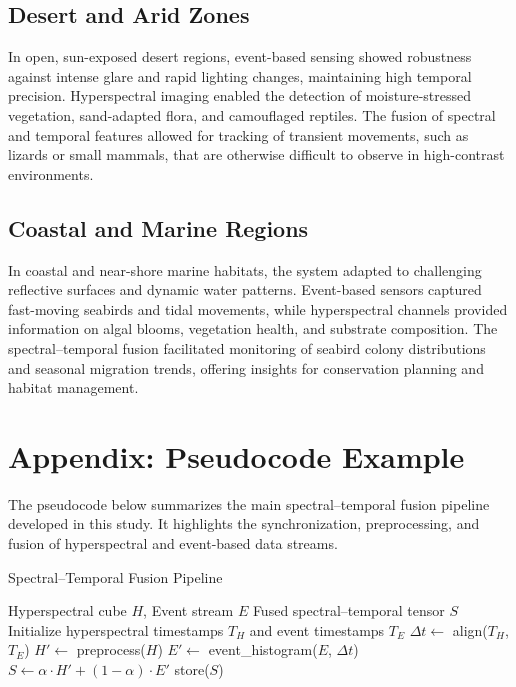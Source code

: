 \documentclass[conference]{IEEEtran}
\begin{document}
\subsection{Desert and Arid Zones}
In open, sun-exposed desert regions, event-based sensing showed robustness against intense glare and rapid lighting changes, maintaining high temporal precision. Hyperspectral imaging enabled the detection of moisture-stressed vegetation, sand-adapted flora, and camouflaged reptiles. The fusion of spectral and temporal features allowed for tracking of transient movements, such as lizards or small mammals, that are otherwise difficult to observe in high-contrast environments.

\subsection{Coastal and Marine Regions}
In coastal and near-shore marine habitats, the system adapted to challenging reflective surfaces and dynamic water patterns. Event-based sensors captured fast-moving seabirds and tidal movements, while hyperspectral channels provided information on algal blooms, vegetation health, and substrate composition. The spectral–temporal fusion facilitated monitoring of seabird colony distributions and seasonal migration trends, offering insights for conservation planning and habitat management.


\section{Appendix: Pseudocode Example}

The pseudocode below summarizes the main spectral–temporal fusion pipeline developed in this study. It highlights the synchronization, preprocessing, and fusion of hyperspectral and event-based data streams.

\begin{algorithm}[H]
\caption{Spectral–Temporal Fusion Pipeline}
\label{alg:fusion}
\begin{algorithmic}[1]
\Require Hyperspectral cube $H$, Event stream $E$
\Ensure Fused spectral–temporal tensor $S$
\State Initialize hyperspectral timestamps $T_H$ and event timestamps $T_E$
    \State $\Delta t \gets$ align($T_H$, $T_E$)
    \State $H' \gets$ preprocess($H$) 
    \State $E' \gets$ event\_histogram($E$, $\Delta t$) 
    \State $S \gets \alpha \cdot H' + (1-\alpha) \cdot E'$ 
    \State store($S$)
\EndWhile
\end{algorithmic}
\end{algorithm}
\end{document}
